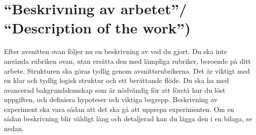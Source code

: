 \section{``Beskrivning av arbetet''/ ``Description of the work'') }

Efter avsnitten ovan följer nu en beskrivning av vad du gjort. Du ska inte använda rubriken ovan, utan ersätta den med lämpliga rubriker, beroende på ditt arbete. Strukturen ska göras tydlig genom avsnittsrubrikerna. Det är viktigt med en klar och tydlig logisk struktur och ett berättande flöde. Du ska ha med avancerad bakgrundskunskap som är nödvändig för att förstå hur du löst uppgiften, och definiera hypoteser och viktiga begrepp. Beskrivning av experiment ska vara sådan att det ska gå att upprepa experimenten. Om en sådan beskrivning blir väldigt lång och detaljerad kan du lägga den i en bilaga, se nedan.  


